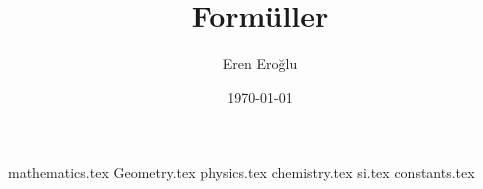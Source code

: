\documentclass[a4paper, 10pt]{report}
\author{Eren Eroğlu}
\date{\today}
\title{Formüller}
\newcommand{\refresh}{
    \pagestyle{fancy}
    \fancyhf{}
    \lhead{\thepage}
}
\begin{document}
    \newtheorem*{theorem}{Teori}
    \theoremstyle{definition}
    \newtheorem*{definition}{Tanım}
    \refresh
    \maketitle
    \tableofcontents
    {mathematics.tex}
    {Geometry.tex}
    {physics.tex}
    {chemistry.tex}
    {si.tex}
    {constants.tex}
\end{document}
